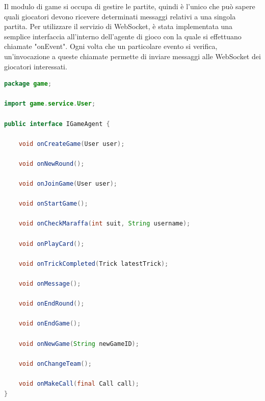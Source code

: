 Il modulo di game si occupa di gestire le partite, quindi è l'unico che può sapere quali giocatori devono ricevere determinati messaggi relativi a una singola partita. Per utilizzare il servizio di WebSocket, è stata implementata una semplice interfaccia all'interno dell'agente di gioco con la quale si effettuano chiamate "onEvent". Ogni volta che un particolare evento si verifica, un'invocazione a queste chiamate permette di inviare messaggi alle WebSocket dei giocatori interessati.

\begin{lstlisting}[language=Java, caption={Interfaccia per gestire chiamate websocket}, label=list:java_websocket_interface]
package game;

import game.service.User;

public interface IGameAgent {

	void onCreateGame(User user);

	void onNewRound();

	void onJoinGame(User user);

	void onStartGame();

	void onCheckMaraffa(int suit, String username);

	void onPlayCard();

	void onTrickCompleted(Trick latestTrick);

	void onMessage();

	void onEndRound();

	void onEndGame();

	void onNewGame(String newGameID);

	void onChangeTeam();

	void onMakeCall(final Call call);
}
\end{lstlisting}



